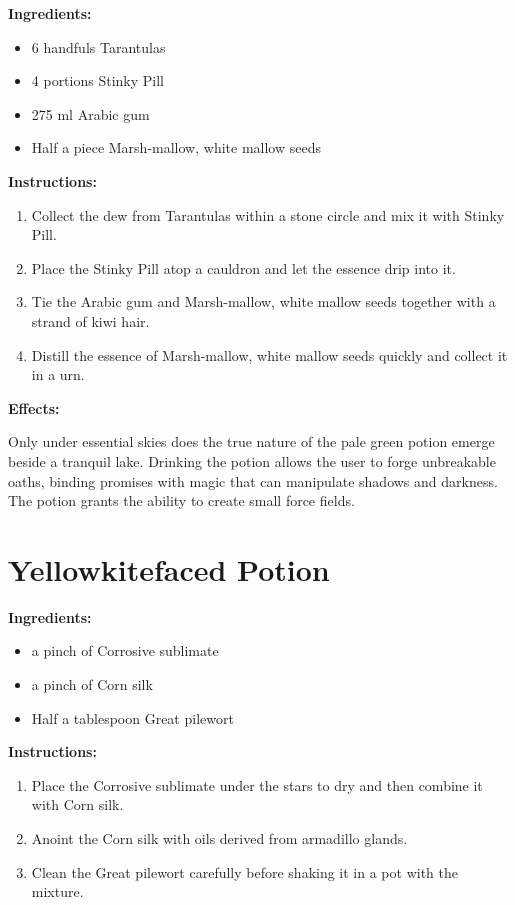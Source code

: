 \documentclass{article}
\begin{document}
\textbf{Ingredients:}

\begin{itemize}
  \item 6 handfuls Tarantulas
  \item 4 portions Stinky Pill
  \item 275 ml Arabic gum
  \item Half a piece Marsh-mallow, white mallow seeds
\end{itemize}

\textbf{Instructions:}

\begin{enumerate}
  \item Collect the dew from Tarantulas within a stone circle and mix it with Stinky Pill.
  \item Place the Stinky Pill atop a cauldron and let the essence drip into it.
  \item Tie the Arabic gum and Marsh-mallow, white mallow seeds together with a strand of kiwi hair.
  \item Distill the essence of Marsh-mallow, white mallow seeds quickly and collect it in a urn.
\end{enumerate}

\textbf{Effects:}

Only under essential skies does the true nature of the pale green potion emerge beside a tranquil lake. Drinking the potion allows the user to forge unbreakable oaths, binding promises with magic that can manipulate shadows and darkness. The potion grants the ability to create small force fields.

\newpage
\section*{Yellowkitefaced Potion}

\textbf{Ingredients:}

\begin{itemize}
  \item a pinch of Corrosive sublimate
  \item a pinch of Corn silk
  \item Half a tablespoon Great pilewort
\end{itemize}

\textbf{Instructions:}

\begin{enumerate}
  \item Place the Corrosive sublimate under the stars to dry and then combine it with Corn silk.
  \item Anoint the Corn silk with oils derived from armadillo glands.
  \item Clean the Great pilewort carefully before shaking it in a pot with the mixture.
\end{enumerate}
\end{document}

